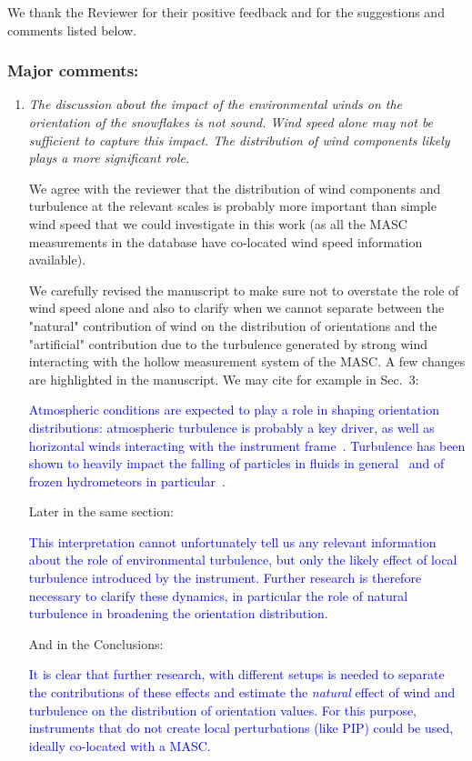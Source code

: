 \documentclass[12pt]{article}
\newcommand*{\blue}{\textcolor{blue}}
\begin{document}
\noindent
We thank the Reviewer for their positive feedback and for the suggestions and comments listed below. 

\subsubsection*{Major comments:}
\begin{enumerate}
    \item \textit{The discussion about the impact of the environmental winds on the orientation of the snowflakes is not sound. Wind speed alone may not be sufficient to capture this impact. The distribution of wind components likely plays a more significant role.}

    We agree with the reviewer that the distribution of wind components and turbulence at the relevant scales is probably more important than simple wind speed that we could investigate in this work (as all the MASC measurements in the database have co-located wind speed information available).
    
    We carefully revised the manuscript to make sure not to overstate the role of wind speed alone and also to clarify when we cannot separate between the "natural" contribution of wind on the distribution of orientations and the "artificial" contribution due to the turbulence generated by strong wind interacting with the hollow measurement system of the MASC. A few changes are highlighted in the manuscript. We may cite for example in Sec.~3:

    \blue{Atmospheric conditions are expected to play a role in shaping orientation distributions: atmospheric turbulence is probably a key driver, as well as horizontal winds interacting with the instrument frame~\cite{Fitch_AMT_2021}. Turbulence has been shown to heavily impact the falling of particles in fluids in general~\cite{Petersen_JFM_2019,Brandt_ARFM_2022} and of frozen hydrometeors in particular~\cite{Nemes_JFM_2017,Li_JFM_2021}.}

     Later in the same section:

    \blue{This interpretation cannot unfortunately tell us any relevant information about the role of environmental turbulence, but only the likely effect of local turbulence introduced by the instrument.  Further research is therefore necessary to clarify these dynamics, in particular the role of natural turbulence in broadening the orientation distribution.}   

    And in the Conclusions:

    \blue{It is clear that further research, with different setups is needed to separate the contributions of these effects and estimate the \textit{natural} effect of wind and turbulence on the distribution of orientation values. For this purpose, instruments that do not create local perturbations (like PIP) could be used, ideally co-located with a MASC. }
\end{enumerate}
\end{document}
